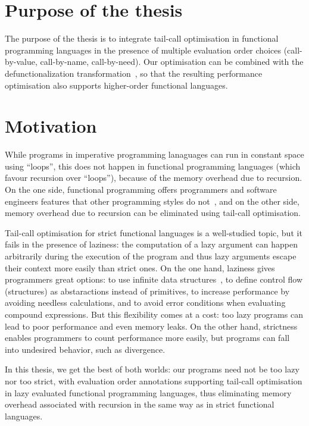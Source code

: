 \documentclass[diploma]{softlab-thesis}
\begin{document}
\section {Purpose of the thesis}

The purpose of the thesis is to integrate tail-call optimisation in functional programming languages 
in the presence of multiple evaluation order choices (call-by-value, call-by-name, call-by-need). 
Our optimisation can be combined with the defunctionalization transformation~\cite{Reynolds72definitionalinterpreters}, 
so that the resulting performance optimisation also supports higher-order functional languages. 

\section {Motivation}

While programs in imperative programming lanaguages can run in constant space using ``loops'', 
this does not happen in functional programming languages (which favour recursion over ``loops''), because of the memory overhead due to recursion.
On the one side, functional programming offers programmers and software engineers features that other 
programming styles do not~\cite{Hughes89}, and on the other side, memory overhead due to recursion can 
be eliminated using tail-call optimisation.

Tail-call optimisation for strict functional languages is a well-studied topic, but it fails in the 
presence of laziness: the computation of a lazy argument can happen arbitrarily during the execution 
of the program and thus lazy arguments escape their context more easily than strict ones.
On the one hand, laziness gives programmers great options: to use infinite data structures~\cite{Abel13}, 
to define control flow (structures) as abstaractions instead of primitives, to increase performance
by avoiding needless calculations, and to avoid error conditions when evaluating compound expressions.
But this flexibility comes at a cost: too lazy programs can lead to poor performance and even memory leaks.
On the other hand, strictness enables programmers to count performance more easily, but programs can 
fall into undesired behavior, such as divergence.

In this thesis, we get the best of both worlds: our programs need not be too lazy nor too strict,
with evaluation order annotations supporting tail-call optimisation in lazy evaluated 
functional programming languages, thus eliminating memory overhead associated with recursion in the 
same way as in strict functional languages.
\end{document}
